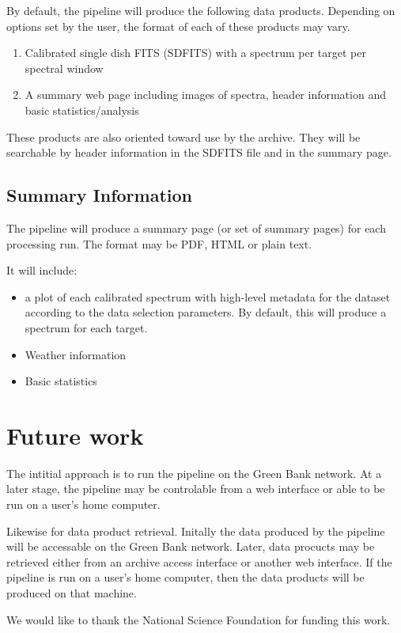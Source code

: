 By default, the pipeline will produce the following data products.  Depending on options set by the user, the format of each of these products may vary.
\begin{enumerate}
\item Calibrated single dish FITS (SDFITS) with a spectrum per target per spectral window
\item A summary web page including images of spectra, header information and basic statistics/analysis
\end{enumerate}

These products are also oriented toward use by the archive.  They will be searchable by header information in the SDFITS file and in the summary page.

\subsection{Summary Information}

The pipeline will produce a summary page (or set of summary pages) for each processing run.  The format may be PDF, HTML or plain text.

It will include:
\begin{itemize}
\item a plot of each calibrated spectrum with high-level metadata for the dataset according to the data selection parameters.  By default, this will produce a spectrum for each target.
\item Weather information
\item Basic statistics
\end{itemize}

\section{Future work}

The intitial approach is to run the pipeline on the Green Bank network.  At a later stage, the pipeline may be controlable from a web interface or able to be run on a user's home computer.

Likewise for data product retrieval.  Initally the data produced by the pipeline will be accessable on the Green Bank network.  Later, data procucts may be retrieved either from an archive access interface or another web interface.  If the pipeline is run on a user's home computer, then the data products will be produced on that machine.

\acknowledgements We would like to thank the National Science Foundation for funding this work.


